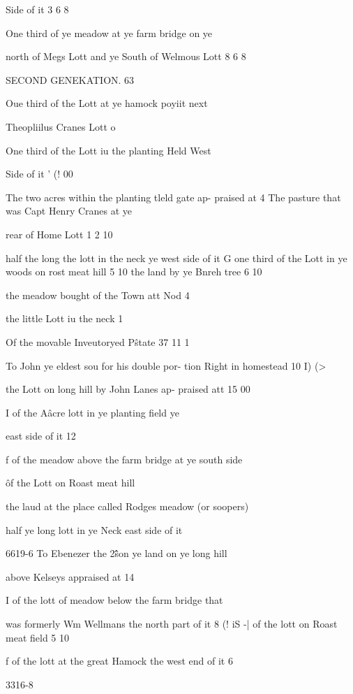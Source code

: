 \documentclass{book}
\begin{document}
Side of it 3  6  8 

One third of ye meadow at ye farm bridge on ye 

north of Megs Lott and ye South of Welmous Lott 8  6  8 



SECOND GENEKATION. 63 

Oue third of the Lott at ye hamock poyiit next 

Theopliilus Cranes Lott o   

One third of the Lott iu the planting Held West 

Side of it ' (! 00 

The two acres within the planting tleld gate ap- 
praised at 4   
The pasture that was Capt Henry Cranes at ye 

rear of Home Lott 1 2  10  

half the long the lott in the neck ye west side of it G   
one third of the Lott in ye woods on rost meat hill 5  10  
the land by ye Bnreh tree 6  10  

the meadow bought of the Town att Nod 4   

the little Lott iu the neck 1   

Of the movable Inveutoryed P\^state 37  11  1 

To John ye eldest sou for his double por- 
tion Right in homestead 10  I)  (> 

the Lott on long hill by John Lanes ap- 
praised att 15  00 

I of the A\^ acre lott in ye planting field ye 

east side of it 12   

f of the meadow above the farm bridge at 
ye south side 

\^ of the Lott on Roast meat hill 

the laud at the place called Rodges meadow 
(or soopers) 

half ye long lott in ye Neck east side of it 

6619-6 
To Ebenezer the 2\^\^ son ye land on ye long hill 

above Kelseys appraised at 14   

I of the lott of meadow below the farm bridge that 

was formerly Wm Wellmans the north part of it 8  (!  iS 
-| of the lott on Roast meat field 5  10  

f of the lott at the great Hamock the west end of it 6   

3316-8 
\end{document}
